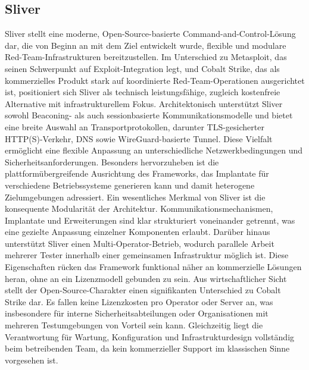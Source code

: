 \subsection{Sliver}
Sliver stellt eine moderne, Open-Source-basierte Command-and-Control-Lösung dar, die von Beginn an mit dem Ziel entwickelt wurde, flexible und modulare Red-Team-Infrastrukturen bereitzustellen. Im Unterschied zu Metasploit, das seinen Schwerpunkt auf Exploit-Integration legt, und Cobalt Strike, das als kommerzielles Produkt stark auf koordinierte Red-Team-Operationen ausgerichtet ist, positioniert sich Sliver als technisch leistungsfähige, zugleich kostenfreie Alternative mit infrastrukturellem Fokus.
\newline\newline
Architektonisch unterstützt Sliver sowohl Beaconing- als auch sessionbasierte Kommunikationsmodelle und bietet eine breite Auswahl an Transportprotokollen, darunter TLS-gesicherter HTTP(S)-Verkehr, DNS sowie WireGuard-basierte Tunnel. Diese Vielfalt ermöglicht eine flexible Anpassung an unterschiedliche Netzwerkbedingungen und Sicherheitsanforderungen. Besonders hervorzuheben ist die plattformübergreifende Ausrichtung des Frameworks, das Implantate für verschiedene Betriebssysteme generieren kann und damit heterogene Zielumgebungen adressiert.
\newline\newline
Ein wesentliches Merkmal von Sliver ist die konsequente Modularität der Architektur. Kommunikationsmechanismen, Implantate und Erweiterungen sind klar strukturiert voneinander getrennt, was eine gezielte Anpassung einzelner Komponenten erlaubt. Darüber hinaus unterstützt Sliver einen Multi-Operator-Betrieb, wodurch parallele Arbeit mehrerer Tester innerhalb einer gemeinsamen Infrastruktur möglich ist. Diese Eigenschaften rücken das Framework funktional näher an kommerzielle Lösungen heran, ohne an ein Lizenzmodell gebunden zu sein.
\newline\newline
Aus wirtschaftlicher Sicht stellt der Open-Source-Charakter einen signifikanten Unterschied zu Cobalt Strike dar. Es fallen keine Lizenzkosten pro Operator oder Server an, was insbesondere für interne Sicherheitsabteilungen oder Organisationen mit mehreren Testumgebungen von Vorteil sein kann. Gleichzeitig liegt die Verantwortung für Wartung, Konfiguration und Infrastrukturdesign vollständig beim betreibenden Team, da kein kommerzieller Support im klassischen Sinne vorgesehen ist.
\newline\newline
